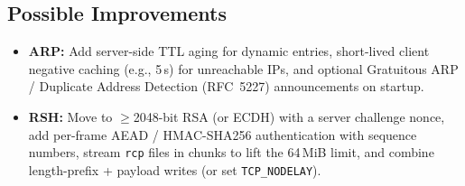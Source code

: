 \documentclass[11pt,a4paper]{article}
\begin{document}
\subsection{Possible Improvements}
\begin{itemize}
  \item \textbf{ARP:} Add server-side TTL aging for dynamic entries, short-lived client negative caching (e.g., 5\,s) for unreachable IPs, and optional Gratuitous ARP / Duplicate Address Detection (RFC~5227) announcements on startup.
  \item \textbf{RSH:} Move to $\ge$2048-bit RSA (or ECDH) with a server challenge nonce, add per-frame AEAD / HMAC-SHA256 authentication with sequence numbers, stream \texttt{rcp} files in chunks to lift the 64\,MiB limit, and combine length-prefix + payload writes (or set \texttt{TCP\_NODELAY}).
\end{itemize}
\end{document}
